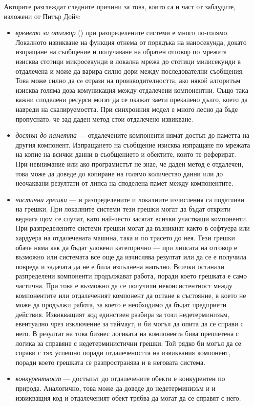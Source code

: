 Авторите разглеждат следните причини за това, които са и част от заблудите, изложени от Питър Дойч:

\begin{itemize}
  \item \emph{времето за отговор} () при разпределените системи е много по-голямо. Локалното извикване на функция отнема от порядъка на наносекунда, докато изпращане на съобщение и получаване на обратен отговор по мрежата изисква стотици микросекунди в локална мрежа до стотици милисекунди в отдалечена и може да варира силно дори между последователни съобщения. Това може силно да сe отрази на производителността, ако някой алгоритъм изисква голяма доза комуникация между отдалечени компонентни. Също така важни споделени ресурси могат да се окажат заети прекалено дълго, което да навреди на скалируемостта. При синхронния модел е много лесно да бъде пропуснато, че зад даден метод стои отдалечено извикване.
  
  \item \emph{достъп до паметта} — отдалечените компоненти нямат достъп до паметта на другия компонент. Изпращането на съобщение изисква изпращане по мрежата на копие на всички данни в съобщението и обектите, които те реферират. При невнимание или ако програмистът не знае, че даден метод е отдалечен, това може да доведе до копиране на голямо количество данни или до неочаквани резултати от липса на споделена памет между компонентите.
  
  \item \emph{частични грешки} — и разпределените и локалните изчисления са податливи на грешки. При локалните системи тези грешки могат да бъдат открити веднага щом се случат, като най-често засягат всички участващи компоненти. При разпределените системи грешки могат да възникнат както в софтуера или хардуера на отдалечената машина, така и по трасето до нея. Тези грешки обаче няма как да бъдат уловени категорично — при липсата на отговор е възможно или системата все още да изчислява резултат или да се е получила повреда и задачата да не е била изпълнена напълно. Всички останали разпределени компоненти продължават работа, поради което грешката е само частична. При това е възможно да се получили неконсистентност между компонентите или отдалеченият компонент да остане в състояние, в което не може да продължи работа, за което е необходимо да бъдат предприети действия. Извикващият код единствен разбира за този недетерминизъм, евентуално чрез изключение за таймаут, и би могъл да опита да се справи с него. В резултат на това бизнес логиката на компонента бива преплетена с логика за справяне с недетерминистични грешки. Той рядко би могъл да се справи с тях успешно поради отдалечеността на извиквания компонент, поради което грешката се разпространява и в неговата система.
  
  \item \emph{конкурентност} — достъпът до отдалечените обекти е конкурентен по природа. Аналогично, това може да доведе до недетерминизъм и и извикващия код и отдалеченият обект трябва да могат да се справят с него.
\end{itemize} 

